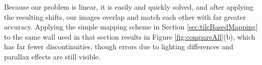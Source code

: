 \documentclass[]{spie}  %
\begin{document}
Because our problem is linear, it is easily and quickly solved, and
after applying the resulting shifts, our images overlap and match each
other with far greater accuracy. Applying the simple mapping scheme in
Section \ref{sec:tileBasedMapping} to the same wall used in that
section results in Figure \ref{fig:compareAll}(b), which has far fewer
discontinuities, though errors due to lighting differences and
parallax effects are still visible.

\end{document}

